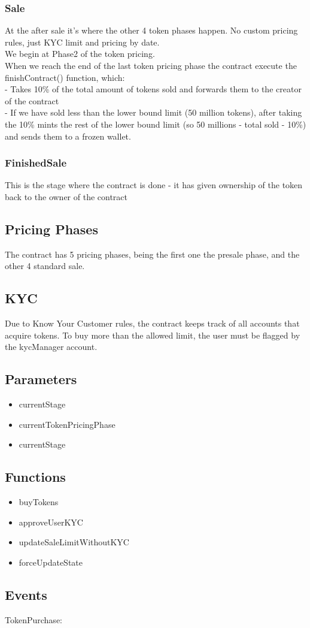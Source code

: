 \documentclass[11pt]{article} %
\begin{document}
\subsubsection{Sale}
At the after sale it's where the other 4 token phases happen. No custom pricing rules, just KYC limit and pricing by date.\\
We begin at Phase2 of the token pricing.\\
When we reach the end of the last token pricing phase the contract execute the finishContract() function, which:\\
- Takes 10\% of the total amount of tokens sold and forwards them to the creator of the contract\\
- If we have sold less than the lower bound limit (50 million tokens), after taking the 10\% mints the rest of the lower bound limit (so 50 millions - total sold - 10\%) and sends them to a frozen wallet. 

\subsubsection{FinishedSale}
This is the stage where the contract is done - it has given ownership of the token back to the owner of the contract

\subsection{Pricing Phases}
The contract has 5 pricing phases, being the first one the presale phase, and the other 4 standard sale.

\subsection{KYC}
Due to Know Your Customer rules, the contract keeps track of all accounts that acquire tokens. To buy more than the allowed limit, the user must be flagged by the kycManager account.

\subsection{Parameters}
\begin{itemize}
\item currentStage
\item currentTokenPricingPhase
\item currentStage
\end{itemize}

\subsection{Functions}
\begin{itemize}
\item buyTokens
\item approveUserKYC
\item updateSaleLimitWithoutKYC
\item forceUpdateState
\end{itemize}

\subsection{Events}

TokenPurchase:
\end{document}
